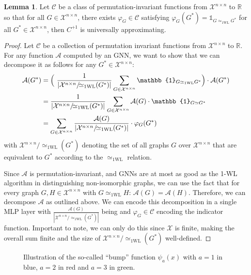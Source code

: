 \documentclass[11pt, dvipsnames, DIV=12]{scrreprt}
\theoremstyle{definition}
\newtheorem{lemma}[theorem]{Lemma}
\newcommand{\cA}{\mathcal{A}}
\newcommand{\cC}{\mathcal{C}}
\newcommand{\cX}{\mathcal{X}}
\newcommand{\Rb}{\mathbb{R}}
\newcommand{\wliso}{\simeq_{\text{1WL}}}
\newcommand{\xnn}{\mathcal{X}^{n \times n}}
\begin{document}
\begin{lemma}
    Let $\mathcal{C}$ be a class of permutation-invariant functions from $\mathcal{X}^{n \times n}$ to $\Rb$ so that for all $G \in \mathcal{X}^{n \times n}$, there exists 
    $\varphi_G \in \cC$ satisfying $\varphi_G(G^*) = \mathbb{1}_{G \wliso G^*}$ for all $G^* \in \xnn$, then $C^{+1}$ is universally approximating.
\end{lemma}

\begin{proof}
    Let $\mathcal{C}$ be a collection of permutation invariant functions from $\mathcal{X}^{n\times n}$ to $\Rb$. For any function $\mathcal{A}$ computed by an GNN, we want to show that we can decompose it as follows for any $G^* \in \mathcal{X}^{n \times n}$:
    \begin{align}
        \mathcal{A}(G^*) &= \Bigl( \ \frac{1}{|\xnn/\!{\wliso}(G^*)|}\sum_{G \in \xnn} \mathbb{1}_{G \wliso G^*} \Bigr) \cdot \mathcal{A}(G^*) \nonumber \\
        &= \frac{1}{|\xnn/\!{\wliso}(G^*)|}\sum_{G \in \mathcal{X}^{n \times n}} \mathcal{A}(G) \cdot \mathbb{1}_{G \simeq G^*} \nonumber \\
        &= \sum_{G \in \mathcal{X}^{n \times n}} \frac{\mathcal{A}(G)}{|\xnn/\!{\wliso}(G^*)|}  \cdot \varphi_G(G^*)
    \end{align}
    with $\xnn/\!{\wliso}(G^*)$ denoting the set of all graphs $G$ over $\xnn$ that are equivalent to $G^*$ according to the $\wliso$ relation.

    Since $\cA$ is permutation-invariant, and GNNs are at most as good as the 1-WL algorithm in distinguishing non-isomorphic graphs, we can use the fact that for every graph $G,H \in \xnn$ with $G \wliso H$: $\cA(G) = \cA(H)$. Therefore, we can decompose $\cA$ as outlined above. We can encode this decomposition in a single MLP layer with $\frac{\cA(G)}{|\xnn/\!{\wliso}(G^*)|}$ being and $\varphi_G \in \cC$ encoding the indicator function. Important to note, we can only do this since $\cX$ is finite, making the overall sum finite and the size of $\xnn/\!{\wliso}(G^*)$ well-defined.
    
\end{proof}

\begin{figure}
    \centering
    
    \label{fig:bump-function}
    \caption{Illustration of the so-called ``bump'' function $\psi_a(x)$ with $a = 1$ in blue, $ a = 2$ in red and $a = 3$ in green.} 
\end{figure}




\end{document}
